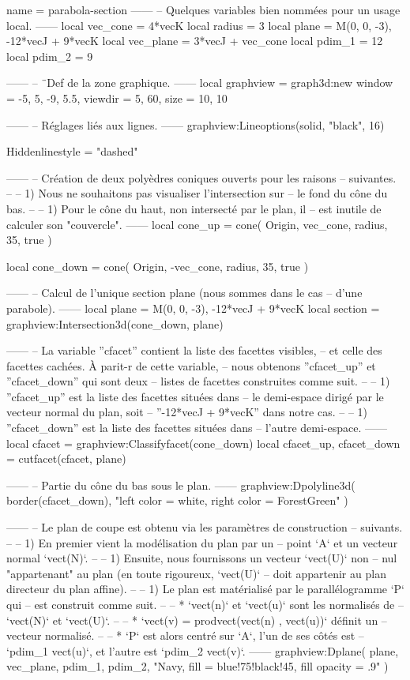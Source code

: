 \documentclass{standalone}
\begin{document}
\begin{luadraw}{name = parabola-section}
------
-- Quelques variables bien nommées pour un usage local.
------
local vec_cone  = 4*vecK
local radius  = 3
local plane   = {M(0, 0, -3), -12*vecJ + 9*vecK}
local vec_plane = 3*vecJ + vec_cone
local pdim_1  = 12
local pdim_2  = 9

------
-- ¨Def de la zone graphique.
------
local graphview = graph3d:new{
  window  = {-5, 5, -9, 5.5},
  viewdir = {5, 60},
  size    = {10, 10}
}

------
-- Réglages liés aux lignes.
------
graphview:Lineoptions(solid, "black", 16)

Hiddenlinestyle = "dashed"

------
-- Création de deux polyèdres coniques ouverts pour les raisons
-- suivantes.
--
--     1) Nous ne souhaitons pas visualiser l'intersection sur
--     le fond du cône du bas.
--
--     1) Pour le cône du haut, non intersecté par le plan, il
--     est inutile de calculer son "couvercle".
------
local cone_up = cone(
  Origin, vec_cone, radius,
  35,
  true
)

local cone_down = cone(
  Origin, -vec_cone, radius,
  35,
  true
)

------
-- Calcul de l'unique section plane (nous sommes dans le cas
-- d'une parabole).
------
local plane   = {M(0, 0, -3), -12*vecJ + 9*vecK}
local section = graphview:Intersection3d(cone_down, plane)

------
-- La variable ''cfacet'' contient la liste des facettes visibles,
-- et celle des facettes cachées. À parit-r de cette variable,
-- nous obtenons ''cfacet_up'' et ''cfacet_down'' qui sont deux
-- listes de facettes construites comme suit.
--
--   1) ''cfacet_up'' est la liste des facettes situées dans
--   le demi-espace dirigé par le vecteur normal du plan, soit
--   ''-12*vecJ + 9*vecK'' dans notre cas.
--
--   1) ''cfacet_down'' est la liste des facettes situées dans
--   l’autre demi-espace.
------
local cfacet                 = graphview:Classifyfacet(cone_down)
local cfacet_up, cfacet_down = cutfacet(cfacet, plane)

------
-- Partie du cône du bas sous le plan.
------
graphview:Dpolyline3d(
  border(cfacet_down),
  "left color = white, right color = ForestGreen"
)

------
-- Le plan de coupe est obtenu via les paramètres de construction
-- suivants.
--
--     1) En premier vient la modélisation du plan par un
--     point `A` et un vecteur normal `vect(N)`.
--
--     1) Ensuite, nous fournissons un vecteur `vect(U)` non
--     nul "appartenant" au plan (en toute rigoureux, `vect(U)`
--     doit appartenir au plan directeur du plan affine).
--
--     1) Le plan est matérialisé par le parallélogramme `P` qui
--     est construit comme suit.
--
--         * `vect(n)` et `vect(u)` sont les normalisés de
--         `vect(N)` et `vect(U)`.
--
--         * `vect(v) = prodvect(vect(n) , vect(u))` définit un
--         vecteur normalisé.
--
--         * `P` est alors centré sur `A`, l'un de ses côtés est
--         `pdim_1 vect(u)`, et l'autre est `pdim_2 vect(v)`.
------
graphview:Dplane(
  plane,
  vec_plane, pdim_1, pdim_2,
  "Navy, fill = blue!75!black!45, fill opacity = .9"
)


\end{luadraw}
\end{document}
